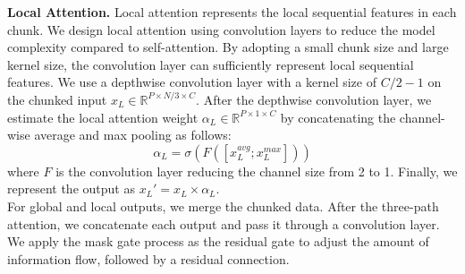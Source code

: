 \documentclass{article}
\begin{document}
\noindent \textbf{Local Attention.} Local attention represents the local sequential features in each chunk. We design local attention using convolution layers to reduce the model complexity compared to self-attention. By adopting a small chunk size and large kernel size, the convolution layer can sufficiently represent local sequential features. We use a depthwise convolution layer with a kernel size of $C/2-1$ on the chunked input $x_L \in \mathbb{R}^{P \times N/3 \times C}$. After the depthwise convolution layer, we estimate the local attention weight $\alpha_{L} \in \mathbb{R}^{P \times 1 \times C} $ by concatenating the channel-wise average and max pooling as follows:
\begin{equation}
\alpha_{L}= \sigma(F([x_{L}^{avg};x_{L}^{max}]))
\label{eq:local attention}
\end{equation}
\noindent where $F$ is the convolution layer reducing the channel size from 2 to 1. Finally, we represent the output as $x_{L}'=x_{L} \times \alpha_{L}$. \\
\indent For global and local outputs, we merge the chunked data. After the three-path attention, we concatenate each output and pass it through a convolution layer. We apply the mask gate process as the residual gate to adjust the amount of information flow, followed by a residual connection.
\end{document}
